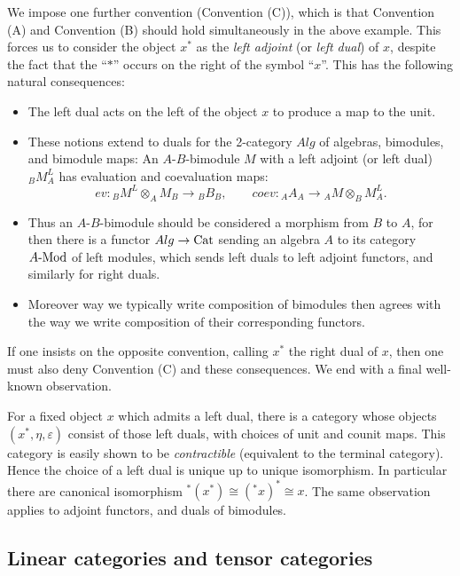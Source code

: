 \documentclass{amsart}
\begin{document}
We impose one further convention (Convention (C)), which is that Convention (A) and Convention (B) should hold simultaneously in the above example. This forces us to consider the object $x^*$ as the {\em left adjoint} (or {\em left dual}) of $x$, despite the fact that the ``$*$'' occurs on the right of the symbol ``$x$''. This has the following natural consequences:
\begin{itemize}
	\item The left dual acts on the left of the object $x$ to produce a map to the unit. 
	\item These notions extend to duals for the 2-category $Alg$ of algebras, bimodules, and bimodule maps: An $A$-$B$-bimodule $M$ with a left adjoint (or left dual) ${}_BM^L_A$ has evaluation and coevaluation maps:
	\begin{equation*}
		ev: {}_BM^L \otimes_A M_{B} \to {}_B B_B, \quad \quad coev: {}_AA_A \to {}_A M \otimes_B M^L_A.
	\end{equation*}
	\item Thus an $A$-$B$-bimodule should be considered a morphism from $B$ to $A$, for then there is a functor $Alg \to \mathrm{Cat}$ sending an algebra $A$ to its category $\Mod{A}{}$ of left modules, which sends left duals to left adjoint functors, and similarly for right duals. 
	\item Moreover way we typically write composition of bimodules then agrees with the way we write composition of their corresponding functors. 
\end{itemize}

If one insists on the opposite convention, calling $x^*$ the right dual of $x$, then one must also deny Convention (C) and these consequences. We end with a final well-known observation. 


\begin{remark}
	For a fixed object $x$ which admits a left dual, there is a category whose objects $(x^*, \eta, \varepsilon)$ consist of those left duals, with choices of unit and counit maps. This category is easily shown to be {\em contractible} (equivalent to the terminal category). Hence the choice of a left dual is unique up to unique isomorphism. In particular there are canonical isomorphism ${}^*(x^*) \cong ({}^*x)^* \cong x$. 
The same observation applies to adjoint functors, and duals of bimodules.  
\end{remark}


\subsection{Linear categories and tensor categories} \label{sec-tc-lincat}
\end{document}
